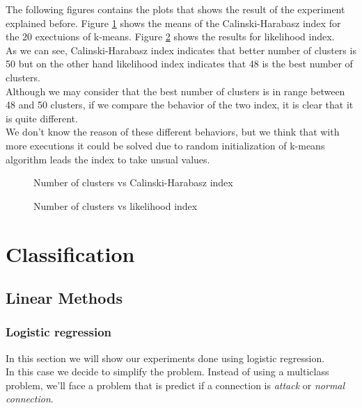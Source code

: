 \documentclass[a4paper]{article} %
\begin{document}
The following figures contains the plots that shows the result of the experiment explained before. Figure \ref{calinski} shows the means of the Calinski-Harabasz index for the 20 exectuions of k-means. Figure \ref{likelihood} shows the results for likelihood index. \\

As we can see, Calinski-Harabasz index indicates that better number of clusters is 50 but on the other hand likelihood index indicates that 48 is the best number of clusters. \\
Although we may consider that the best number of clusters is in range between 48 and 50 clusters, if we compare the behavior of the two index, it is clear that it is quite different. \\
We don't know the reason of these different behaviors, but we think that with more executions it could be solved due to random initialization of k-means algorithm leads the index to take unsual values.
\begin{figure}[H]
	\centering
	\label{calinski}
	\caption{Number of clusters vs Calinski-Harabasz index}
\end{figure}


\begin{figure}[H]
	\centering
	\label{likelihood}
	\caption{Number of clusters vs likelihood index}
\end{figure}





\section{Classification}
\subsection{Linear Methods}
\subsubsection{Logistic regression}
In this section we will show our experiments done using logistic regression. \\
In this case we decide to simplify the problem. Instead of using a multiclass problem, we'll face a problem that is predict if a connection is \textit{attack} or \textit{normal connection}. \\
\end{document}
